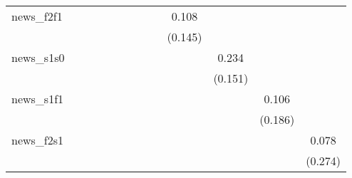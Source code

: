 {\begin{tabular}{l*{12}{c}}
\addlinespace
news\_f2f1   &                     &                     &                     &                     &                     &                     &                     &                     &       0.108         &                     &                     &                     \\
            &                     &                     &                     &                     &                     &                     &                     &                     &     (0.145)         &                     &                     &                     \\
\addlinespace
news\_s1s0   &                     &                     &                     &                     &                     &                     &                     &                     &                     &       0.234         &                     &                     \\
            &                     &                     &                     &                     &                     &                     &                     &                     &                     &     (0.151)         &                     &                     \\
\addlinespace
news\_s1f1   &                     &                     &                     &                     &                     &                     &                     &                     &                     &                     &       0.106         &                     \\
            &                     &                     &                     &                     &                     &                     &                     &                     &                     &                     &     (0.186)         &                     \\
\addlinespace
news\_f2s1   &                     &                     &                     &                     &                     &                     &                     &                     &                     &                     &                     &       0.078         \\
            &                     &                     &                     &                     &                     &                     &                     &                     &                     &                     &                     &     (0.274)         \\

\end{tabular}}
